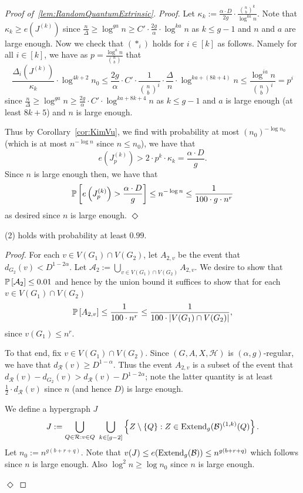 \documentclass[11pt]{article}
\newcommand{\mc}[1]{\mathcal{#1}}
\newcounter{i}
\theoremstyle{plain}
\newenvironment{proofclaim}[1][]%
{\noindent \emph{Proof.} {}{#1}{}}{\hfill
	$\Diamond$\vspace{1em}}
\renewcommand{\theclaim}{\thetheorem.\arabic{claim}}
\newenvironment{lateproof}[1]
 {%
  \renewcommand{\theclaim}{\ref{#1}.\arabic{claim}}%
  \begin{proof}[Proof of~\cref{#1}]%
 }
 {\end{proof}}
\theoremstyle{plain} %
\theoremstyle{definition}
\newcommand{\Prob}[1]{\ensuremath{%
\mathbb P\left[#1\right]
}}
\begin{document}
\begin{lateproof}{lem:RandomQuantumExtrinsic}
\begin{proofclaim}
Let $\kappa_k:= \frac{\alpha\cdot D}{2g} \cdot \frac{\binom{n}{b}^k}{\log^{ka} n}$. Note that $\kappa_k\ge e\left(J^{(k)}\right)$ since $\frac{n}{\Delta} \ge \log^{ga} n \ge C' \cdot \frac{2g}{\alpha} \cdot \log^{ka} n$ as $k\le g-1$ and $n$ and $a$ are large enough. Now we check that $(*_i)$ holds for $i\in [k]$ as follows. Namely for all $i\in [k]$, we have as $p=\frac{\log^a n}{\binom{n}{b}}$ that
$$\frac{\Delta_i\left(J^{(k)}\right)}{\kappa_k}\cdot \log^{4k+2}n_0\le \frac{2g}{\alpha}\cdot C'\cdot \frac{1}{\binom{n}{b}^i}\cdot \frac{\Delta}{n} \cdot \log^{ka+(8k+4)}n \le \frac{\log^{ia} n}{\binom{n}{b}^i} = p^i$$ since $\frac{n}{\Delta} \ge \log^{ga}{n} \ge \frac{2g}{\alpha}\cdot C'\cdot \log^{ka+8k+4} n$ as  $k\le g-1$ and $a$ is large enough (at least $8k+5$) and $n$ is large enough. 

Thus by Corollary~\ref{cor:KimVu}, we find with probability at most
$(n_0)^{-\log n_0}$ (which is at most $n^{-\log n}$ since $n\le n_0$), we have that
$$e\left(J^{(k)}_p\right) > 2\cdot p^k\cdot \kappa_k = \frac{\alpha \cdot D}{g}.$$ 
Since $n$ is large enough then, we have that
$$\Prob{e\left(J^{(k)}_p\right) > \frac{\alpha\cdot D}{g}} \le n^{-\log n} \le  \frac{1}{100\cdot g\cdot n^r}$$
as desired since $n$ is large enough.
\end{proofclaim}

\begin{claim}\label{cl:6Holds}
(2) holds with probability at least $0.99$.    
\end{claim}
\begin{proofclaim}
For each $v\in V(G_1)\cap V(G_2)$, let $A_{2,v}$ be the event that $d_{G_2}(v) < D^{1-2\alpha}$.
Let $\mathcal{A}_2 := \bigcup_{v\in V(G_1)\cap V(G_2)} A_{2,v}$. We desire to show that $\Prob{\mc{A}_2} \le 0.01$ and hence by the union bound it suffices to show that for each $v\in V(G_1)\cap V(G_2)$
$$\Prob{A_{2,v}} \le \frac{1}{100\cdot n^r} \le \frac{1}{100\cdot |V(G_1)\cap V(G_2)|},$$
since $v(G_1)\le n^r$.

To that end, fix $v\in V(G_1)\cap V(G_2)$. Since $(G,A,X,\mc{H})$ is $(\alpha,g)$-regular, we have that $d_{\mc{R}}(v) \ge D^{1-\alpha}$.
Thus the event $A_{2,v}$ is a subset of the event that $d_{\mc{R}}(v) - d_{G_2}(v) > d_{\mc{R}}(v)-D^{1-2\alpha}$; note the latter quantity is at least $\frac{1}{2}\cdot d_{\mc{R}}(v)$ since $n$ (and hence $D$) is large enough.

We define a hypergraph $J$ 
$$J:= \bigcup_{Q\in \mc{R}: v\in Q}~\bigcup_{k\in [g-2]} \left\{ Z\setminus \{Q\}: Z\in{\rm Extend}_g(\mc{B})^{(1,k)}(Q)\right\}.$$
Let $n_0:= n^{g(b+r+q)}$. Note that $v(J) \le e({\rm Extend}_g(\mc{B})) \le n^{g(b+r+q)}$ which follows since $n$ is large enough. Also $\log^2 n\ge \log n_0$ since $n$ is large enough.


\end{proofclaim}
\end{lateproof}
\end{document}
